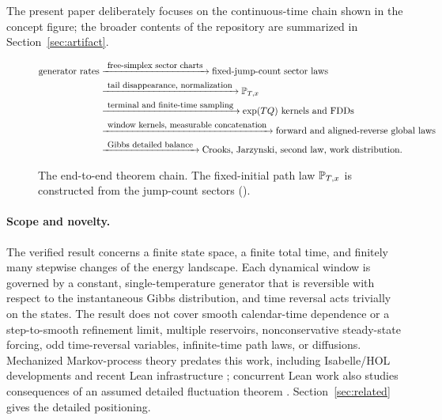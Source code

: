 The present paper deliberately focuses on the continuous-time chain shown in the concept figure; the broader contents of the repository are summarized in Section~\ref{sec:artifact}.
\begin{figure}[htbp]
\centering
\[
\begin{aligned}
  \text{generator rates}
    &\xrightarrow{\ \text{\small free-simplex sector charts}\ }
      \text{fixed-jump-count sector laws}\\
    &\xrightarrow{\ \text{\small tail disappearance, normalization}\ }
      \Pp_{T,x}\\
    &\xrightarrow{\ \text{\small terminal and finite-time sampling}\ }
      \exp(TQ)\text{ kernels and FDDs}\\
    &\xrightarrow{\ \text{\small window kernels, measurable concatenation}\ }
      \text{forward and aligned-reverse global laws}\\
    &\xrightarrow{\ \text{\small Gibbs detailed balance}\ }
      \text{Crooks, Jarzynski, second law, work distribution}.
\end{aligned}
\]
\caption{The end-to-end theorem chain. The fixed-initial path law $\mathbb{P}_{T,x}$ is constructed from the jump-count sectors ().}
\end{figure}

\paragraph{Scope and novelty.}
The verified result concerns a finite state space, a finite total time, and finitely many stepwise changes of the energy landscape. Each dynamical window is governed by a constant, single-temperature generator that is reversible with respect to the instantaneous Gibbs distribution, and time reversal acts trivially on the states. The result does not cover smooth calendar-time dependence or a step-to-smooth refinement limit, multiple reservoirs, nonconservative steady-state forcing, odd time-reversal variables, infinite-time path laws, or diffusions. Mechanized Markov-process theory predates this work, including Isabelle/HOL developments and recent Lean infrastructure \parencite{Hoelzl2017,AFPMarkovModels,Marion2025,Ripple2026}; concurrent Lean work also studies consequences of an assumed detailed fluctuation theorem \parencite{PhysicsAIDFT}. Section~\ref{sec:related} gives the detailed positioning.
